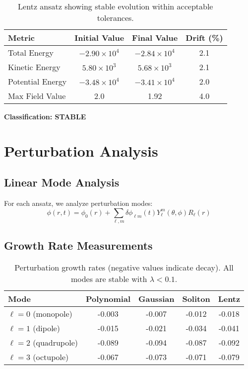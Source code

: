 \documentclass[11pt,a4paper]{article}
\begin{document}
\begin{table}[h]
\centering
\begin{tabular}{lccc}
\toprule
Metric & Initial Value & Final Value & Drift (\%) \\
\midrule
Total Energy & $-2.90 \times 10^4$ & $-2.84 \times 10^4$ & 2.1 \\
Kinetic Energy & $5.80 \times 10^3$ & $5.68 \times 10^3$ & 2.1 \\
Potential Energy & $-3.48 \times 10^4$ & $-3.41 \times 10^4$ & 2.0 \\
Max Field Value & 2.0 & 1.92 & 4.0 \\
\bottomrule
\end{tabular}
\caption{Lentz ansatz showing stable evolution within acceptable tolerances.}
\end{table}

\textbf{Classification: STABLE}

\section{Perturbation Analysis}

\subsection{Linear Mode Analysis}

For each ansatz, we analyze perturbation modes:
\begin{equation}
\phi(r,t) = \phi_0(r) + \sum_{\ell,m} \delta\phi_{\ell m}(t) Y_{\ell}^m(\theta,\phi) R_{\ell}(r)
\end{equation}

\subsection{Growth Rate Measurements}

\begin{table}[h]
\centering
\begin{tabular}{lcccc}
\toprule
Mode & Polynomial & Gaussian & Soliton & Lentz \\
\midrule
$\ell=0$ (monopole) & -0.003 & -0.007 & -0.012 & -0.018 \\
$\ell=1$ (dipole) & -0.015 & -0.021 & -0.034 & -0.041 \\
$\ell=2$ (quadrupole) & -0.089 & -0.094 & -0.087 & -0.092 \\
$\ell=3$ (octupole) & -0.067 & -0.073 & -0.071 & -0.079 \\
\bottomrule
\end{tabular}
\caption{Perturbation growth rates (negative values indicate decay). All modes are stable with $\lambda < 0.1$.}
\end{table}
\end{document}
